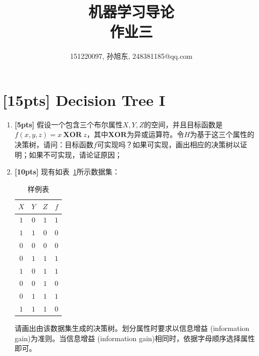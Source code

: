 \documentclass[a4paper,UTF8]{article}
\numberwithin{equation}{section}
\begin{document}
\title{机器学习导论\\
作业三}
\author{151220097, 孙旭东, 248381185@qq.com}
\maketitle



\section{[15pts] Decision Tree I}

\begin{enumerate}[ {(}1{)}]
	\item \textbf{[5pts]} 假设一个包含三个布尔属性${X, Y, Z}$的空间，并且目标函数是$f(x,y,z) = x\ \mathbf{XOR}\ z$，其中$\mathbf{XOR}$为异或运算符。令$H$为基于这三个属性的决策树，请问：目标函数$f$可实现吗？如果可实现，画出相应的决策树以证明；如果不可实现，请论证原因；
	
	\item \textbf{[10pts]} 现有如表~\ref{table:ranking}所示数据集：
	
	\begin{table}[!h]
		\centering
		\caption{样例表} \vspace{2mm}\label{table:ranking}
		\begin{tabular}{c c c|c}\hline
			$X$ & $Y$ & $Z$ & $f$ \\
			\hline
			$1$ & $0$  & $1$ &  $1$\\
			$1$ & $1$  & $0$ &  $0$\\
			$0$ & $0$  & $0$ &  $0$\\
			$0$ & $1$  & $1$ &  $1$\\
			$1$ & $0$  & $1$ &  $1$\\
			$0$ & $0$  & $1$ &  $0$\\
			$0$ & $1$  & $1$ &  $1$\\
			$1$ & $1$  & $1$ &  $0$\\
			\hline
		\end{tabular}
	\end{table}
	
	请画出由该数据集生成的决策树。划分属性时要求以信息增益 (information gain)为准则。当信息增益 (information gain)相同时，依据字母顺序选择属性即可。
\end{enumerate}
\end{document}
